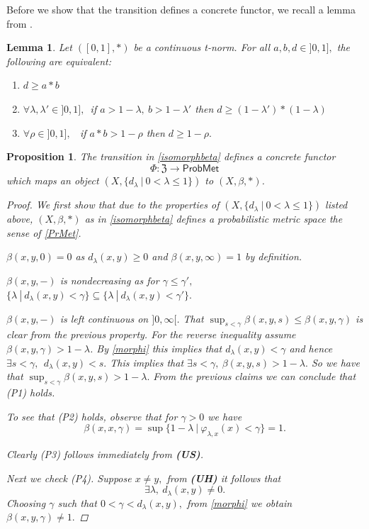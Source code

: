 \documentclass[12pt,a4paper]{amsart}
\theoremstyle{theorem}
\newtheorem{proposition}[theorem]{Proposition}
\newtheorem{lemma}[theorem]{Lemma}
\theoremstyle{definition}
\newcommand{\PM}{\ensuremath{\mathsf{ProbMet_{}}}}
\renewcommand{\b}{\ensuremath{\beta}}
\renewcommand{\l}{\ensuremath{\lambda}}
\def\rw{\rightarrow}
\begin{document}
{Before we show that the transition defines a concrete functor, we recall a lemma from \cite{CL2}.
\begin{lemma}\label{star}
Let $([0,1], *)$ be a continuous t-norm. For all $a,b,d \in ]0,1],$ the following are equivalent:
\begin{enumerate}
\item $d \geq a * b$
\item $\forall \l,\l' \in ]0,1], $\  if $a > 1-\l, \ b > 1-\l'$ then $d \geq (1-\l') * (1-\l)$
\item $\forall \rho  \in ]0,1],$ \ if $a * b > 1-\rho$ then $d \geq 1-\rho.$
\end{enumerate}
\end{lemma}


\begin{proposition}\label{Phi}
The transition in \eqref{isomorphbeta} defines a concrete functor $$\Phi: \mathfrak{Z} \rw \PM$$ which maps an object $(X, \{ d_\l \ | \ 0 < \l \leq 1 \})$ to $(X, \b, *)$. 
\begin{proof}
We first show that due to the properties of  $(X, \{ d_\l \ | \ 0 < \l \leq 1 \})$ listed above, $(X, \b, *)$  as in \eqref{isomorphbeta} defines a probabilistic metric space the sense of \eqref{PrMet}.

$\b(x,y,0) =0$ as $d_\l(x,y) \geq 0$ and $\b(x,y,\infty) =1$ by definition.

$\b(x,y,-)$ is nondecreasing as for $\gamma \leq \gamma',$  $\{ \l \ | \ d_\l(x,y) < \gamma\} \subseteq \{ \l \ | \ d_\l(x,y) < \gamma'\}.$


$\b(x,y,-)$ is left continuous on $]0, \infty[$. That $\sup_{s < \gamma} \b(x,y,s) \leq  \b(x,y,\gamma)$ is clear from the previous property. For the reverse inequality assume $\b(x,y,\gamma) > 1 - \l$. By \eqref{morphi} this implies that $d_\l(x,y) < \gamma$  and hence $\exists s < \gamma,  \ \ d_\l(x,y) < s.$ This implies that $\exists s <\gamma,  \  \b(x,y,s) > 1 - \l.$ So we have that $\sup_{s < \gamma} \b(x,y,s) > 1 - \l.$
From the previous claims we can conclude that (P1) holds.

To see that (P2) holds,  observe that for $\gamma >0$  we have\\
 $$\b(x,x,\gamma) = \sup \{1 - \l \ | \ \varphi_{\l,x} (x) < \gamma\}  = 1.$$

Clearly (P3) follows immediately from {\bf(US)}.

Next we check (P4). Suppose $x \not = y,$  from {\bf (UH)} it follows that $$\exists \l, \ d_\l(x,y) \not = 0.$$
Choosing $\gamma$ such that $0 < \gamma < d_\l(x,y), $ from \eqref{morphi} we obtain $\b(x,y,\gamma) \not = 1.$


\end{proof}
\end{proposition}}
\end{document}
